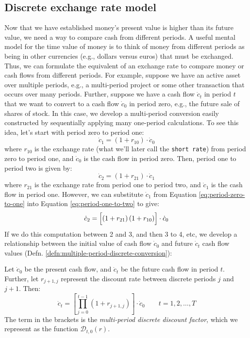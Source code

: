 \documentclass[11pt]{article}
\theoremstyle{definition}
\begin{document}
\subsection{Discrete exchange rate model}
Now that we have established money’s present value is higher than its future value, we need a way to compare cash from different periods. 
A useful mental model for the time value of money is to think of money from different periods 
as being in other currencies (e.g., dollars versus euros) that must be exchanged. 
Thus, we can formulate the equivalent of an exchange rate to compare money or cash flows from different periods. 
For example, suppose we have an active asset over multiple periods, e.g., a multi-period project or some other transaction that occurs over many periods. 
Further, suppose we have a cash flow $\dot{c}_{t}$ in period $t$ that we want to convert to a cash flow $\dot{c}_{0}$ in period zero, e.g., the future sale of shares of stock.
In this case, we develop a multi-period conversion easily constructed by sequentially applying many one-period calculations. 
To see this idea, let's start with period zero to period one:
\begin{equation}\label{eq:period-zero-to-one}
\dot{c}_{1} = \left(1+r_{10}\right)\cdot\dot{c}_{0}
\end{equation}
where $r_{10}$ is the exchange rate (what we'll later call the \texttt{short rate}) from period zero to period one, and $\dot{c}_{0}$ is the cash flow in period zero.
Then, period one to period two is given by:
\begin{equation}\label{eq:period-one-to-two}
\dot{c}_{2} = \left(1+r_{21}\right)\cdot\dot{c}_{1}
\end{equation}
where $r_{21}$ is the exchange rate from period one to period two, and $\dot{c}_{1}$ is the cash flow in period one. 
However, we can substitute $\dot{c}_{1}$ from Equation \ref{eq:period-zero-to-one} into Equation \ref{eq:period-one-to-two} to give:
\begin{equation}\label{eq:period-one-to-two-substituted}
\dot{c}_{2} = \Bigl[\left(1+r_{21}\right)\left(1+r_{10}\right)\Bigr]\cdot\dot{c}_{0}
\end{equation}
If we do this computation between 2 and 3, and then 3 to 4, etc, we develop a relationship between the initial value of cash flow 
$\dot{c}_{0}$ and future $\dot{c}_{t}$ cash flow values (Defn. \ref{defn:multiple-period-discrete-conversion}):

\begin{definition}\label{defn:multiple-period-discrete-conversion}
Let $\dot{c}_0$ be the present cash flow, and $\dot{c}_t$ be the future cash flow in period $t$. 
Further, let $r_{j+1,j}$ represent the discount rate between discrete periods $j$ and $j+1$. Then: 
\begin{equation}
\dot{c}_{t} = \left[\prod_{j=0}^{t-1}\left(1+r_{j+1,j}\right)\right]\cdot\dot{c}_{0}\qquad{t=1,2,\dots,T}
\end{equation}
The term in the brackets is the \textit{multi-period discrete discount factor}, which we represent as the function $\mathcal{D}_{t,0}(r)$.
\end{definition}
\end{document}
